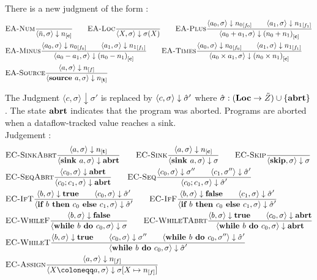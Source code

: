There is a new judgment of the form 
:
\begin{align*}
    &\bsrule{EA-Num}{}{\bigstep{\literalint}{\store}{\clean}} \qquad
    \bsrule{EA-Loc}{}{\bigstep{X}{\store}{\store(X)}}\qquad
    \bsrule{EA-Plus}
    {\bigstep{a_0}{\store}{\flagged[n_0][0]}
    \qquad \bigstep{a_1}{\store}{\flagged[n_1][1]}}
    {\bigstep{a_0+a_1}{\store}{\clean[(n_0+n_1)]}}\\
    &\bsrule{EA-Minus}
    {\bigstep{a_0}{\store}{\flagged[n_0][0]}
    \qquad \bigstep{a_1}{\store}{\flagged[n_1][1]}}
    {\bigstep{a_0-a_1}{\store}{\clean[(n_0-n_1)]}} \qquad
    \bsrule{EA-Times}
    {\bigstep{a_0}{\store}{\flagged[n_0][0]}
    \qquad \bigstep{a_1}{\store}{\flagged[n_1][1]}}
    {\bigstep{a_0 \times a_1}{\store}{\clean[(n_0 \times n_1)]}}\\
    &\bsrule{EA-Source}{\bigstep{a}{\store}{\flagged}}
    {\bigstep{\source{a}}{\store}{\tracked}}
\end{align*}

The Judgment $\langle c, \sigma \rangle \downarrow \sigma'$ is replaced by 
$\langle c, \sigma \rangle \downarrow \hat{\sigma}'$
where $\hat{\sigma}{}: (\textbf{Loc} \to \tilde{Z}) \cup \{\textbf{abrt}\}$.
The state $\textbf{abrt}$ indicates that the program was aborted.
Programs are aborted when a dataflow-tracked value reaches a sink.
\\
Judgement :
\begin{align*}
    &\bsrule{EC-SinkAbrt}{\bigstep{a}{\store}{\tracked{}}}
    {\bigstep{\defaultsink}{\store}{\exception}} \qquad
    \bsrule{EC-Sink}{\bigstep{a}{\store}{\clean{}}}
    {\bigstep{\defaultsink}{\store}{\store}} \qquad
    \bsrule{EC-Skip}{}{\bigstep{\skipcmd}{\store}{\store}}\\
    &\bsrule{EC-SeqAbrt}{\bigstep{c_0}{\sigma}{\exception}}
    {\bigstep{\defaultseq}{\store}{\exception}} \qquad
    \bsrule{EC-Seq}{\bigstep{c_0}{\sigma}{\store''} \qquad \bigstep{c_1}{\store''}{\excstore'}}
    {\bigstep{\defaultseq}{\store}{\excstore'}}\\
    &\bsrule{EC-IfT}{\bigstep{b}{\store}{\btrue}\qquad \bigstep{c_0}{\store}{\excstore'}}
    {\bigstep{\defaultif}{\store}{\excstore'}} \qquad
    \bsrule{EC-IfF}{\bigstep{b}{\store}{\bfalse}\qquad \bigstep{c_1}{\store}{\excstore'}}
    {\bigstep{\defaultif}{\store}{\excstore'}}\\
    &\bsrule{EC-WhileF}{\bigstep{b}{\sigma}{\bfalse}}
    {\bigstep{\defaultwhile}{\store}{\store}} \qquad
    \bsrule{EC-WhileTAbrt}{\bigstep{b}{\sigma}{\btrue} \qquad \bigstep{c_0}{\store}{\exception}}
    {\bigstep{\defaultwhile}{\store}{\exception}}\\
    &\bsrule{EC-WhileT}{\bigstep{b}{\sigma}{\btrue} \qquad \bigstep{c_0}{\store}{\store''}\qquad
    \bigstep{\defaultwhile}{\store''}{\excstore'}}
    {\bigstep{\defaultwhile}{\store}{\excstore'}}\\
    &\bsrule{EC-Assign}{\bigstep{a}{\store}{\flagged{}}}
    {\bigstep{\defaultstore}{\store}{\store{}[X \mapsto \flagged{}]}}
\end{align*}

